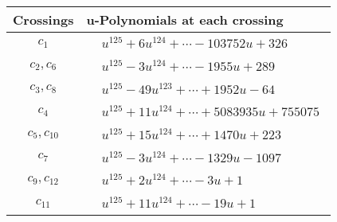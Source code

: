 \documentclass[1p]{elsarticle_modified}
\theoremstyle{definition}
\begin{document}
\begin{tabular}{m{50pt}|m{274pt}}
Crossings & \hspace{64pt}u-Polynomials at each crossing \\
\hline $$\begin{aligned}c_{1}\end{aligned}$$&$\begin{aligned}
&u^{125}+6 u^{124}+\cdots-103752 u+326
\end{aligned}$\\
\hline $$\begin{aligned}c_{2},c_{6}\end{aligned}$$&$\begin{aligned}
&u^{125}-3 u^{124}+\cdots-1955 u+289
\end{aligned}$\\
\hline $$\begin{aligned}c_{3},c_{8}\end{aligned}$$&$\begin{aligned}
&u^{125}-49 u^{123}+\cdots+1952 u-64
\end{aligned}$\\
\hline $$\begin{aligned}c_{4}\end{aligned}$$&$\begin{aligned}
&u^{125}+11 u^{124}+\cdots+5083935 u+755075
\end{aligned}$\\
\hline $$\begin{aligned}c_{5},c_{10}\end{aligned}$$&$\begin{aligned}
&u^{125}+15 u^{124}+\cdots+1470 u+223
\end{aligned}$\\
\hline $$\begin{aligned}c_{7}\end{aligned}$$&$\begin{aligned}
&u^{125}-3 u^{124}+\cdots-1329 u-1097
\end{aligned}$\\
\hline $$\begin{aligned}c_{9},c_{12}\end{aligned}$$&$\begin{aligned}
&u^{125}+2 u^{124}+\cdots-3 u+1
\end{aligned}$\\
\hline $$\begin{aligned}c_{11}\end{aligned}$$&$\begin{aligned}
&u^{125}+11 u^{124}+\cdots-19 u+1
\end{aligned}$\\
\hline
\end{tabular}\\~\\
\end{document}
